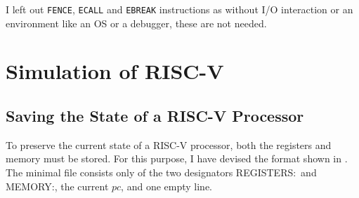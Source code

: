 I left out \texttt{FENCE}, \texttt{ECALL} and \texttt{EBREAK} instructions as
without I/O interaction or an environment like an OS or a debugger, these are
not needed.

\section{Simulation of RISC-V}

\subsection{Saving the State of a RISC-V Processor}\label{statefile}
To preserve the current state of a RISC-V processor, both the registers and
memory must be stored. For this purpose, I have devised the format shown in
. The minimal file consists only of the two designators
\dq REGISTERS:\dq\ and \dq MEMORY:\dq, the current $pc$, and one empty line.
